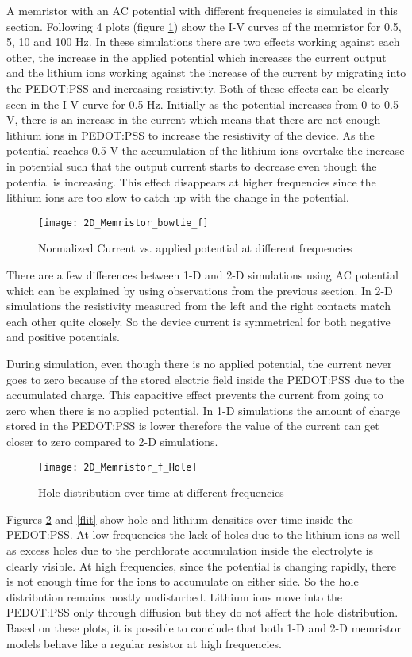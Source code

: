 \begin{doublespace}
A memristor with an AC potential with different frequencies is simulated in this section. Following 4 plots (figure \ref{1dIV}) show the I-V curves of the memristor for 0.5, 5, 10 and 100 Hz. In these simulations there are two effects working against each other, the increase in the applied potential which increases the current output and the lithium ions working against the increase of the current by migrating into the PEDOT:PSS and increasing resistivity. Both of these effects can be clearly seen in the I-V curve for 0.5 Hz. Initially as the potential increases from 0 to 0.5 V, there is an increase in the current which means that there are not enough lithium ions in PEDOT:PSS to increase the resistivity of the device. As the potential reaches 0.5 V the accumulation of the lithium ions overtake the increase in potential such that the output current starts to decrease even though the potential is increasing. This effect disappears at higher frequencies since the lithium ions are too slow to catch up with the change in the potential. 
   
\begin{figure}[!htp]
\centering
\texttt{[image: 2D\_Memristor\_bowtie\_f]}
\caption{Normalized Current vs. applied potential at different frequencies} 
\label{1dIV}
\end{figure}

There are a few differences between 1-D and 2-D simulations using AC potential which can be explained by using observations from the previous section. In 2-D simulations the resistivity measured from the left and the right contacts match each other quite closely. So the device current is symmetrical for both negative and positive potentials. 

During simulation, even though there is no applied potential, the current never goes to zero because of the stored electric field inside the PEDOT:PSS due to the accumulated charge. This capacitive effect prevents the current from going to zero when there is no applied potential. In 1-D simulations the amount of charge stored in the PEDOT:PSS is lower therefore the value of the current can get closer to zero compared to 2-D simulations.  

\begin{figure}[!htp]
\centering
\texttt{[image: 2D\_Memristor\_f\_Hole]}
\caption{Hole distribution over time at different frequencies} 
\label{fhole}
\end{figure}

Figures \ref{fhole} and \ref{flit} show hole and lithium densities over time inside the PEDOT:PSS. At low frequencies the lack of holes due to the lithium ions as well as excess holes due to the perchlorate accumulation inside the electrolyte is clearly visible. At high frequencies, since the potential is changing rapidly, there is not enough time for the ions to accumulate on either side. So the hole distribution remains mostly undisturbed. Lithium ions move into the PEDOT:PSS only through diffusion but they do not affect the hole distribution. Based on these plots, it is possible to conclude that both 1-D and 2-D memristor models behave like a regular resistor at high frequencies. 



\end{doublespace}
